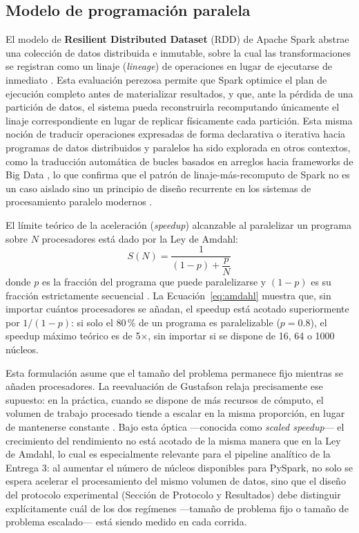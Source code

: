 \documentclass[12pt]{article}
\begin{document}
    \subsection{Modelo de programación paralela}
    \label{sec:programacion-paralela}

    El modelo de \textbf{Resilient Distributed Dataset} (RDD) de Apache Spark abstrae una colección de datos distribuida e inmutable, sobre la cual las transformaciones se registran como un linaje (\emph{lineage}) de operaciones en lugar de ejecutarse de inmediato \parencite{zaharia2012resilient}. Esta evaluación perezosa permite que Spark optimice el plan de ejecución completo antes de materializar resultados, y que, ante la pérdida de una partición de datos, el sistema pueda reconstruirla recomputando únicamente el linaje correspondiente en lugar de replicar físicamente cada partición. Esta misma noción de traducir operaciones expresadas de forma declarativa o iterativa hacia programas de datos distribuidos y paralelos ha sido explorada en otros contextos, como la traducción automática de bucles basados en arreglos hacia frameworks de Big Data \parencite{fegaras2020translation}, lo que confirma que el patrón de linaje-más-recomputo de Spark no es un caso aislado sino un principio de diseño recurrente en los sistemas de procesamiento paralelo modernos \parencite{dai2025state}.

    El límite teórico de la aceleración (\emph{speedup}) alcanzable al paralelizar un programa sobre $N$ procesadores está dado por la Ley de Amdahl:
    \begin{equation}
        S(N) = \frac{1}{(1-p) + \dfrac{p}{N}}
        \label{eq:amdahl}
    \end{equation}
    donde $p$ es la fracción del programa que puede paralelizarse y $(1-p)$ es su fracción estrictamente secuencial \parencite{amdahl1967validity}. La Ecuación~\eqref{eq:amdahl} muestra que, sin importar cuántos procesadores se añadan, el speedup está acotado superiormente por $1/(1-p)$: si solo el 80\,\% de un programa es paralelizable ($p = 0.8$), el speedup máximo teórico es de 5$\times$, sin importar si se dispone de 16, 64 o 1000 núcleos.

    Esta formulación asume que el tamaño del problema permanece fijo mientras se añaden procesadores. La reevaluación de Gustafson relaja precisamente ese supuesto: en la práctica, cuando se dispone de más recursos de cómputo, el volumen de trabajo procesado tiende a escalar en la misma proporción, en lugar de mantenerse constante \parencite{gustafson1988reevaluating}. Bajo esta óptica —conocida como \emph{scaled speedup}— el crecimiento del rendimiento no está acotado de la misma manera que en la Ley de Amdahl, lo cual es especialmente relevante para el pipeline analítico de la Entrega 3: al aumentar el número de núcleos disponibles para PySpark, no solo se espera acelerar el procesamiento del mismo volumen de datos, sino que el diseño del protocolo experimental (Sección de Protocolo y Resultados) debe distinguir explícitamente cuál de los dos regímenes —tamaño de problema fijo o tamaño de problema escalado— está siendo medido en cada corrida.
\end{document}
